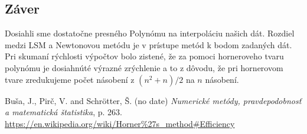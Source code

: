 \documentclass{article}
\theoremstyle{definition}
\theoremstyle{remark}
\begin{document}
\subsection{Záver}\label{sec:nothing}
Dosiahli sme dostatočne presného Polynómu na interpoláciu našich dát. Rozdiel medzi LSM a Newtonovou metódu je v prístupe metód k bodom zadaných dát. Pri skumaní rýchlosti výpočtov bolo zistené, že za pomoci horneroveho tvaru polynómu je dosiahnúté výrazné zrýchlenie a to z dôvodu, že pri hornerovom tvare zredukujeme počet násobení z $(n^2 + n)/2$ na $n$ násobení\cite{wiki}.  
\begin{thebibliography}{99}
 Buša, J., Pirč, V. and Schrötter, Š. (no date) \emph{Numerické metódy, pravdepodobnosť a matematická štatistika}, p. 263.
 \url{https://en.wikipedia.org/wiki/Horner%27s_method#Efficiency}

\end{thebibliography}
\end{document}
